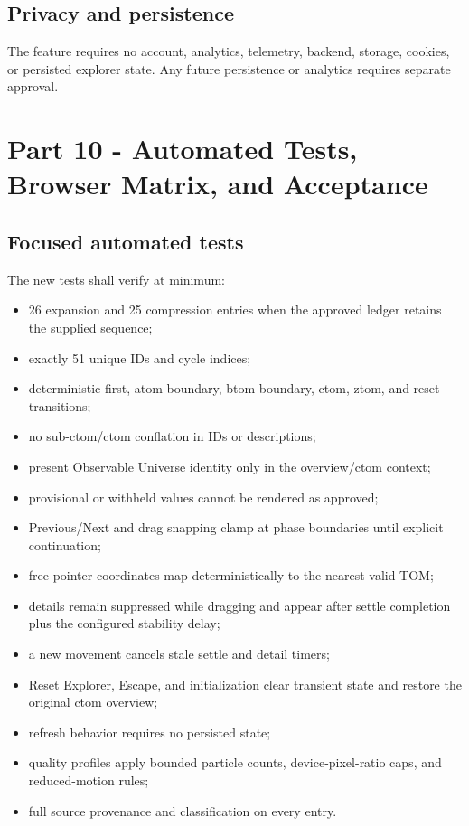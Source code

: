 \documentclass[11pt,letterpaper]{article}
\begin{document}
\subsection{Privacy and persistence}
The feature requires no account, analytics, telemetry, backend, storage, cookies, or persisted explorer state. Any future persistence or analytics requires separate approval.

\section{Part 10 - Automated Tests, Browser Matrix, and Acceptance}
\subsection{Focused automated tests}
The new tests shall verify at minimum:
\begin{itemize}
\item 26 expansion and 25 compression entries when the approved ledger retains the supplied sequence;
\item exactly 51 unique IDs and cycle indices;
\item deterministic first, atom boundary, btom boundary, ctom, ztom, and reset transitions;
\item no sub-ctom/ctom conflation in IDs or descriptions;
\item present Observable Universe identity only in the overview/ctom context;
\item provisional or withheld values cannot be rendered as approved;
\item Previous/Next and drag snapping clamp at phase boundaries until explicit continuation;
\item free pointer coordinates map deterministically to the nearest valid TOM;
\item details remain suppressed while dragging and appear after settle completion plus the configured stability delay;
\item a new movement cancels stale settle and detail timers;
\item Reset Explorer, Escape, and initialization clear transient state and restore the original ctom overview;
\item refresh behavior requires no persisted state;
\item quality profiles apply bounded particle counts, device-pixel-ratio caps, and reduced-motion rules;
\item full source provenance and classification on every entry.
\end{itemize}
\end{document}
